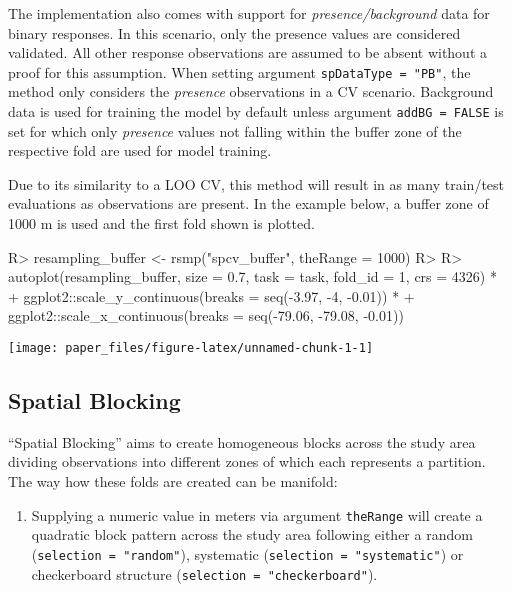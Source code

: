 \documentclass[
]{jss}
\providecommand{\tightlist}{%
  \setlength{\itemsep}{0pt}\setlength{\parskip}{0pt}}
\begin{document}
The implementation also comes with support for
\emph{presence/background} data for binary responses. In this scenario,
only the presence values are considered validated. All other response
observations are assumed to be absent without a proof for this
assumption. When setting argument \texttt{spDataType\ =\ "PB"}, the
method only considers the \emph{presence} observations in a CV scenario.
Background data is used for training the model by default unless
argument \texttt{addBG\ =\ FALSE} is set for which only \emph{presence}
values not falling within the buffer zone of the respective fold are
used for model training.

Due to its similarity to a LOO CV, this method will result in as many
train/test evaluations as observations are present. In the example
below, a buffer zone of 1000 m is used and the first fold shown is
plotted.

\begin{CodeChunk}
\begin{CodeInput}
R> resampling_buffer <- rsmp("spcv_buffer", theRange = 1000)
R> 
R> autoplot(resampling_buffer, size = 0.7, task = task, fold_id = 1, crs = 4326) *
+   ggplot2::scale_y_continuous(breaks = seq(-3.97, -4, -0.01)) *
+   ggplot2::scale_x_continuous(breaks = seq(-79.06, -79.08, -0.01))
\end{CodeInput}


\begin{center}\texttt{[image: paper\_files/figure-latex/unnamed-chunk-1-1]} \end{center}

\end{CodeChunk}

\hypertarget{spatial-blocking}{%
\subsection{Spatial Blocking}\label{spatial-blocking}}

``Spatial Blocking'' aims to create homogeneous blocks across the study
area dividing observations into different zones of which each represents
a partition. The way how these folds are created can be manifold:

\begin{enumerate}
\def\labelenumi{\arabic{enumi}.}
\tightlist
\item
  Supplying a numeric value in meters via argument \texttt{theRange}
  will create a quadratic block pattern across the study area following
  either a random (\texttt{selection\ =\ "random"}), systematic
  (\texttt{selection\ =\ "systematic"}) or checkerboard structure
  (\texttt{selection\ =\ "checkerboard"}).
\end{enumerate}
\end{document}
